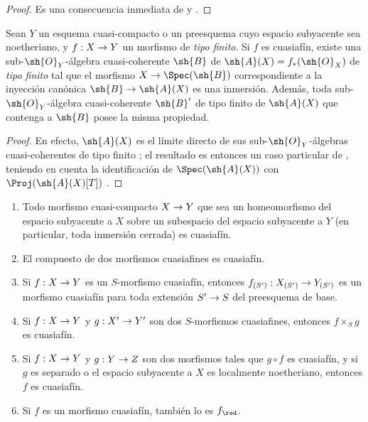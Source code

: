 \documentclass[oneside,10pt]{amsart}
\makeatletter
\newcommand{\ega@arrow}[2]{\mathchoice{#1}{#2}{#2}{#2}}
\renewcommand{\to}{\ega@arrow{\longrightarrow}{\rightarrow}}
\let\EGAOriginalLabel\label
\renewcommand{\label}[1]{\phantomsection\EGAOriginalLabel{#1}}
\makeatother
\begin{document}
\begin{proof}
Es una consecuencia inmediata de  y .
\end{proof}

\begin{corollary}[5.1.9]
\label{II.5.1.9}
Sean $Y$ un esquema cuasi-compacto o un preesquema cuyo espacio subyacente sea noetheriano, y $f:X\to Y$ un morfismo de \emph{tipo finito}.
Si $f$ es cuasiafín, existe una sub-$\sh{O}_Y$-álgebra cuasi-coherente $\sh{B}$ de $\sh{A}(X)=f_*(\sh{O}_X)$ de \emph{tipo finito}  tal que el morfismo $X\to\Spec(\sh{B})$ correspondiente a la inyección canónica $\sh{B}\to\sh{A}(X)$ es una inmersión.
Además, toda sub-$\sh{O}_Y$-álgebra cuasi-coherente $\sh{B}'$ de tipo finito de $\sh{A}(X)$ que contenga a $\sh{B}$ posee la misma propiedad.
\end{corollary}

\begin{proof}
En efecto, $\sh{A}(X)$ es el límite directo de sus sub-$\sh{O}_Y$-álgebras cuasi-coherentes de tipo finito ;
el resultado es entonces un caso particular de , teniendo en cuenta la identificación de $\Spec(\sh{A}(X))$ con $\Proj(\sh{A}(X)[T])$ .
\end{proof}

\begin{proposition}[5.1.10]
\label{II.5.1.10}
\medskip\noindent
\begin{enumerate}
  \item[{\rm(i)}] Todo morfismo cuasi-compacto $X\to Y$ que sea un homeomorfismo del espacio subyacente a $X$ sobre un subespacio del espacio subyacente a $Y$ (en particular, toda inmersión cerrada) es cuasiafín.
  \item[{\rm(ii)}] El compuesto de dos morfismos cuasiafines es cuasiafín.
  \item[{\rm(iii)}] Si $f:X\to Y$ es un $S$-morfismo cuasiafín, entonces $f_{(S')}:X_{(S')}\to Y_{(S')}$ es un morfismo cuasiafín para toda extensión $S'\to S$ del preesquema de base.
  \item[{\rm(iv)}] Si $f:X\to Y$ y $g:X'\to Y'$ son dos $S$-morfismos cuasiafines, entonces $f\times_S g$ es cuasiafín.
  \item[{\rm(v)}] Si $f:X\to Y$ y $g:Y\to Z$ son dos morfismos tales que $g\circ f$ es cuasiafín, y si $g$ es separado o el espacio subyacente a $X$ es localmente noetheriano, entonces $f$ es cuasiafín.
  \item[{\rm(vi)}] Si $f$ es un morfismo cuasiafín, también lo es $f_\red$.
\end{enumerate}
\end{proposition}
\end{document}
